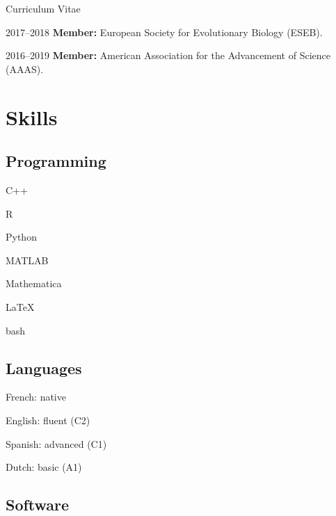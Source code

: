 \documentclass[11pt,a4paper]{article}
\begin{document}
\begin{cv}{Curriculum Vitae}
\begin{cvlist}{}
			\item[2017--2018] \textbf{Member:} European Society for Evolutionary Biology (ESEB).
			
			\item[2016--2019] \textbf{Member:} American Association for the Advancement of Science (AAAS).
			
		\end{cvlist}
		
		\section{Skills}
		
		\subsection{Programming}
		
		\begin{cvlist}{}
		
			\item C++
			\item R
			\item Python
			\item MATLAB
			\item Mathematica
			\item LaTeX
			\item bash
		
		\end{cvlist}
	
		\subsection{Languages}
		
		\begin{cvlist}{}
			
			\item French: native
			\item English: fluent (C2)
			\item Spanish: advanced (C1)
			\item Dutch: basic (A1)
			
		\end{cvlist}
	
		\subsection{Software}
		
		\begin{cvlist}{}
			

\end{cvlist}
\end{cv}
\end{document}

